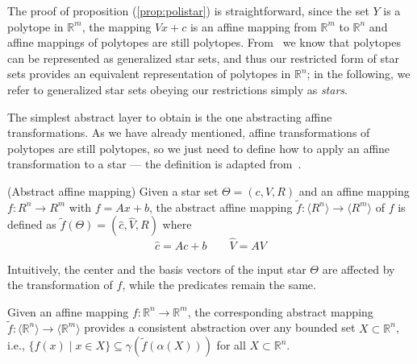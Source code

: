 The proof of proposition (\ref{prop:polistar}) is
straightforward, since the set $Y$ is a polytope in $\mathbb{R}^m$, 
the mapping  $Vx + c$ is an affine mapping from  $\mathbb{R}^m$ to
$\mathbb{R}^n$ and affine mappings of polytopes are still
polytopes. From~\cite{tran2019star} we know that polytopes can be
represented as generalized star sets, and thus our 
restricted form of star sets provides an equivalent representation  
of polytopes in $\mathbb{R}^n$; in the following, we refer
to generalized star sets obeying our restrictions simply as \emph{stars}.

The simplest abstract layer to obtain is the one abstracting affine
transformations. As we have already mentioned, affine transformations
of polytopes are still polytopes, so we just need to define how to
apply an affine transformation to a star --- the definition is
adapted from~\cite{tran2019star}.  

\begin{definition}
  \label{def:absaffine} (Abstract affine mapping)
  \normalfont Given a star set $\Theta = (c,V,R)$ and an affine
  mapping $f : R^n \to R^m$ with $f = Ax + b$, the abstract affine
  mapping $\tilde{f} : \langle R^n \rangle \to \langle R^m \rangle$
  of $f$ is defined as $\tilde{f}(\Theta) = (\hat{c},\hat{V},R)$ where 
  \begin{equation*}
    \hat{c} = Ac + b \qquad \hat{V} = AV 
  \end{equation*}
\end{definition}

Intuitively, the center and the basis vectors of the input star
$\Theta$ are affected by the transformation of $f$, while the
predicates remain the same.

\begin{proposition}
\label{prop:affinecons}
Given an affine mapping $f : \mathbb{R}^n \to \mathbb{R}^m$, the
corresponding abstract mapping $\tilde{f} : \langle
\mathbb{R}^n \rangle \to \langle \mathbb{R}^m \rangle$ provides a consistent
abstraction over any bounded set $X \subset \mathbb{R}^n$, i.e.,
$\{ f(x) \mid x \in X \} \subseteq \gamma(\tilde{f}(\alpha(X)))$ for
all $X \subset \mathbb{R}^n$. 
\end{proposition}

